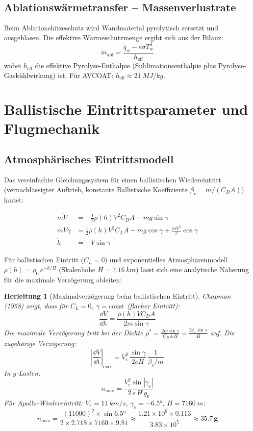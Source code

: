 ﻿\documentclass[12pt,a4paper]{article}
\newtheorem{herleitung}{Herleitung}[section]
\begin{document}
\subsection{Ablationswärmetransfer -- Massenverlustrate}

Beim Ablationshitzeschutz wird Wandmaterial pyrolytisch zersetzt und ausgeblasen.
Die effektive Wärmeschutzmenge ergibt sich aus der Bilanz:
\[
  \dot{m}_{\mathrm{abl}} = \frac{\dot{q}_w - \varepsilon\sigma T_w^4}{h_{\mathrm{eff}}}
\]
wobei $h_{\mathrm{eff}}$ die effektive Pyrolyse-Enthalpie (Sublimationsenthalpie plus
Pyrolyse-Gaskühl\-wirkung) ist. Für AVCOAT: $h_{\mathrm{eff}} \approx \SI{21}{MJ/kg}$.

\section{Ballistische Eintrittsparameter und Flugmechanik}

\subsection{Atmosphärisches Eintrittsmodell}

Das vereinfachte Gleichungssystem für einen ballistischen Wiedereintritt
(vernachlässigter Auftrieb, konstante Ballistische Koeffiziente
$\beta_c = m/(C_D A)$) lautet:

\begin{align}
  m\dot{V} &= -\frac{1}{2}\rho(h) V^2 C_D A - mg\sin\gamma
  \label{eq:flugbahn1}\\
  mV\dot{\gamma} &= \frac{1}{2}\rho(h) V^2 C_L A - mg\cos\gamma
    + \frac{mV^2}{r}\cos\gamma
  \label{eq:flugbahn2}\\
  \dot{h} &= -V\sin\gamma
  \label{eq:flugbahn3}
\end{align}

Für ballistischen Eintritt ($C_L = 0$) und exponentielles Atmosphärenmodell
$\rho(h) = \rho_0\,e^{-h/H}$ (Skalenhöhe $H = \SI{7.16}{km}$) lässt sich eine
analytische Näherung für die maximale Verzögerung ableiten:

\begin{herleitung}[Maximalverzögerung beim ballistischen Eintritt]
Chapman (1958) zeigt, dass für $C_L=0$, $\gamma = \text{const}$ (flacher Eintritt):
\[
  \frac{\dd V}{\dd h} = \frac{\rho(h) V C_D A}{2m\sin\gamma}
\]
Die maximale Verzögerung tritt bei der Dichte
$\rho^* = \frac{2m\sin\gamma}{C_D A\,H} = \frac{2\beta_c\sin\gamma}{H}$
auf. Die zugehörige Verzögerung:
\[
  \left|\frac{\dd V}{\dd t}\right|_{\max} = V_e^2\,\frac{\sin\gamma}{2eH}\,\frac{1}{\beta_c/m}
\]
In $g$-Lasten:
\[
  \boxed{n_{\max} = \frac{V_e^2\sin|\gamma_e|}{2\,e\,H\,g_0}}
\]
Für Apollo-Wiedereintritt: $V_e = \SI{11}{km/s}$, $\gamma_e = -6.5 °$, $H = \SI{7160}{m}$:
\[
  n_{\max} = \frac{(11000)^2 \times \sin 6.5 °}{2\times 2.718\times 7160\times 9.81}
  \approx \frac{1.21\times 10^8\times 0.113}{3.83\times 10^5}
  \approx \mathbf{35.7\,g}
\]
\end{herleitung}
\end{document}
